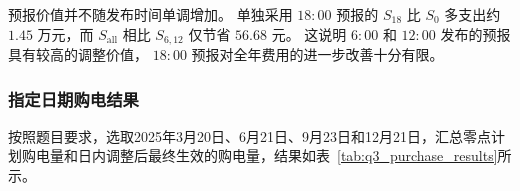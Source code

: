 预报价值并不随发布时间单调增加。
单独采用 \(18{:}00\) 预报的 \(S_{18}\) 比 \(S_0\) 多支出约
\(1.45\) 万元，而 \(S_{\mathrm{all}}\) 相比
\(S_{6,12}\) 仅节省 \(56.68\) 元。
这说明 \(6{:}00\) 和 \(12{:}00\) 发布的预报具有较高的调整价值，
\(18{:}00\) 预报对全年费用的进一步改善十分有限。

\subsubsection{指定日期购电结果}

按照题目要求，选取2025年3月20日、6月21日、9月23日和12月21日，汇总零点计划购电量和日内调整后最终生效的购电量，结果如表~\ref{tab:q3_purchase_results}所示。


